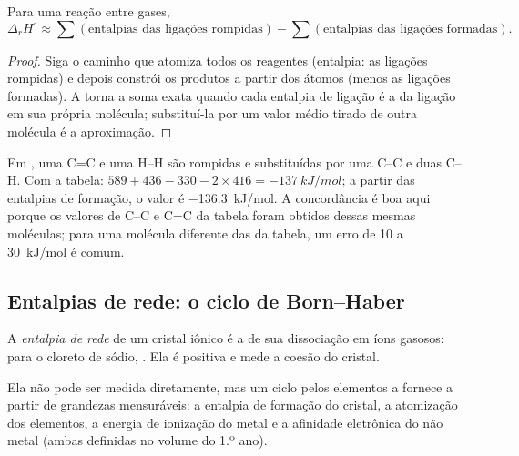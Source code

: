 \begin{proposition}\label{prop:b2:reaction-enthalpy:bond-estimate}
Para uma reação entre gases,
\[
  \Delta_r H^\circ \approx \sum(\text{entalpias das ligações rompidas}) -
  \sum(\text{entalpias das ligações formadas}).
\]
\end{proposition}

\begin{proof}
Siga o caminho que atomiza todos os reagentes (entalpia: as ligações
rompidas) e depois constrói os produtos a partir dos átomos (menos as
ligações formadas). A  torna a soma exata quando cada entalpia
de ligação é a da ligação em sua própria molécula; substituí-la por um
valor médio tirado de outra molécula é a aproximação.
\end{proof}

\begin{example}\label{ex:b2:reaction-enthalpy:hydrogenation}
Em , uma C=C e uma H--H são rompidas e
substituídas por uma C--C e duas C--H. Com a tabela: $589 + 436 - 330 - 2
\times 416 = \qty{-137}{kJ/mol}$; a partir das entalpias de formação, o valor
é \qty{-136.3}{kJ/mol}. A concordância é boa aqui porque os valores de C--C
e C=C da tabela foram obtidos dessas mesmas moléculas; para uma molécula
diferente das da tabela, um erro de 10 a \qty{30}{kJ/mol} é comum.
\end{example}

\subsection*{Entalpias de rede: o ciclo de Born--Haber}

\begin{definition}\label{def:b2:reaction-enthalpy:lattice-enthalpy}
A \emph{entalpia de rede} de um cristal iônico é
a  de sua dissociação em íons gasosos: para o
cloreto de sódio, . Ela é positiva e
mede a coesão do cristal.
\end{definition}

Ela não pode ser medida diretamente, mas um ciclo pelos elementos a fornece
a partir de grandezas mensuráveis: a entalpia de formação do cristal, a
atomização dos elementos, a energia de ionização do metal e a afinidade
eletrônica do não metal (ambas definidas no volume do 1.º ano).

